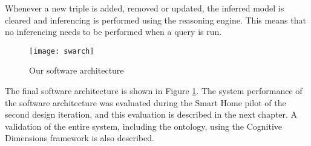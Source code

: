 Whenever a new triple is added, removed or updated, the inferred model is cleared and inferencing is performed using the reasoning engine. This means that no inferencing needs to be performed when a query is run. 

\begin{figure}[bth]
	\centering
	\centerline{\texttt{[image: swarch]}}
	\caption{Our software architecture}
	\label{swarch}
\end{figure}

The final software architecture is shown in Figure \ref{swarch}. The system performance of the software architecture was evaluated during the Smart Home pilot of the second design iteration, and this evaluation is described in the next chapter. A validation of the entire system, including the ontology, using the Cognitive Dimensions framework is also described.







% 

